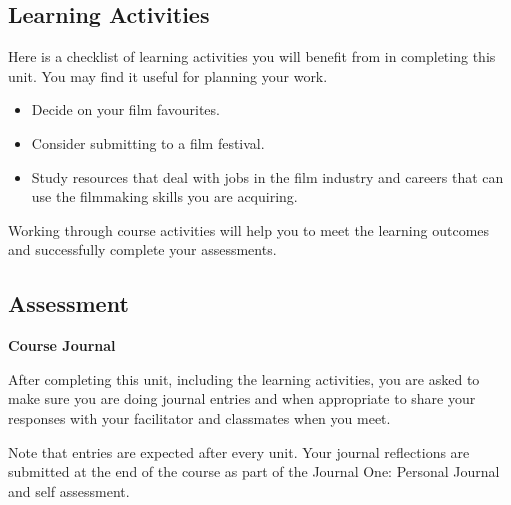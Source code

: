 \documentclass[
  letterpaper,
  DIV=11,
  numbers=noendperiod]{scrreprt}
\providecommand{\tightlist}{%
  \setlength{\itemsep}{0pt}\setlength{\parskip}{0pt}}\usepackage{longtable,booktabs,array}
\begin{document}
\subsection*{Learning Activities}\label{learning-activities-9}

Here is a checklist of learning activities you will benefit from in
completing this unit. You may find it useful for planning your work.

\begin{itemize}
\tightlist
\item
  Decide on your film favourites.
\item
  Consider submitting to a film festival.
\item
  Study resources that deal with jobs in the film industry and careers
  that can use the filmmaking skills you are acquiring.
\end{itemize}

\begin{tcolorbox}[enhanced jigsaw, leftrule=.75mm, bottomrule=.15mm, colback=white, colframe=quarto-callout-note-color-frame, left=2mm, opacityback=0, rightrule=.15mm, breakable, arc=.35mm, toprule=.15mm]
\begin{minipage}[t]{5.5mm}
\textcolor{quarto-callout-note-color}{\faInfo}
\end{minipage}%
\begin{minipage}[t]{\textwidth - 5.5mm}

Working through course activities will help you to meet the learning
outcomes and successfully complete your assessments.

\end{minipage}%
\end{tcolorbox}

\subsection*{Assessment}\label{assessment-9}

\textbf{Course Journal}

After completing this unit, including the learning activities, you are
asked to make sure you are doing journal entries and when appropriate to
share your responses with your facilitator and classmates when you meet.

Note that entries are expected after every unit. Your journal
reflections are submitted at the end of the course as part of the
Journal One: Personal Journal and self assessment.
\end{document}
